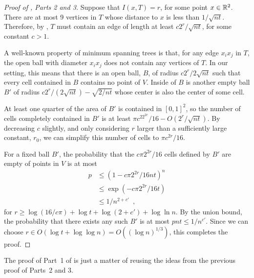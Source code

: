 \documentclass{cccg12}
\begin{document}
\begin{proof}[Proof of , Parts 2 and 3]
Suppose that $I(x,T)=r$, for some point $x\in\mathbb{R}^2$.  There are at most
9 vertices in $T$ whose distance to $x$ is less than $1/\sqrt{nt}$.
Therefore, by , $T$ must contain an edge of length at least
$c2^r/\sqrt{nt}$, for some constant $c>1$.  

A well-known property of minimum spanning trees is that, for any edge
$x_ix_j$ in $T$, the open ball with diameter $x_ix_j$ does not contain
any vertices of $T$.  In our setting, this means that there is an open
ball, $B$, of radius $c2^r/2\sqrt{nt}$ such that every cell contained in
$B$ contains no point of $V$.  Inside of $B$ is another empty ball $B'$
of radius $c2^r/(2\sqrt{nt})-\sqrt{2/nt}$ whose center is also the center
of some cell.

At least one quarter of the area of $B'$ is contained in $[0,1]^2$,
so the number of cells completely contained in $B'$ is at least $\pi c^22^{2r}/16 -
O(2^{r}/\sqrt{nt})$.  By decreasing $c$ slightly, and only considering
$r$ larger than a sufficiently large constant, $r_0$, we can simplify
this number of cells to $\pi c^{2r}/16$.

For a fixed ball $B'$, the probability that the $c\pi  2^{2r}/16$ cells
defined by $B'$ are empty of points in $V$ is at most
\begin{align*}
 p 
  & \le (1-c\pi 2^{2r}/{16nt})^{n} \\
  & \le \exp(-c\pi 2^{2r}/16t) \\
 & \le 1/n^{2+c'} \enspace ,
\end{align*}
for $r\ge\log(16/c\pi)+\log t + \log(2+c')+\log\ln n$.  By the union bound, the
probability that there exists any such $B'$ is at most
$pnt\le 1/n^{c'}$.  Since we can choose $r\in O(\log t+\log\log n) = O((\log
n)^{1/3})$, this completes the proof.
\end{proof}

The proof of Part~1 of  is just a matter of reusing the ideas
from the previous proof of Parts~2 and 3.
\end{document}
